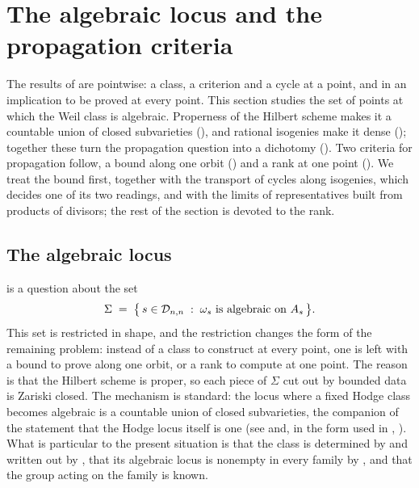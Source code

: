 \section{The algebraic locus and the propagation criteria}\label{sec:propagation}

The results of  are pointwise: a class, a criterion and
a cycle at a point, and in  an implication to be proved
at every point. This section studies the set of points at which the Weil class
is algebraic. Properness of the Hilbert scheme makes it a countable union of
closed subvarieties (), and rational isogenies make it
dense (); together these turn the propagation question
into a dichotomy (). Two criteria for propagation
follow, a bound along one orbit () and a rank at one
point (). We treat the bound first, together with
the transport of cycles along isogenies, which decides one of its two
readings, and with the limits of representatives built from products of
divisors; the rest of the section is devoted to the rank.

\subsection{The algebraic locus}
\label{ssec:properness}

 is a question about the set
\[
  \Sigma \;=\; \bigl\{\,s\in\mathcal{D}_{n,n} \;:\;
    \omega_{s}\ \text{is algebraic on}\ A_{s}\,\bigr\}.
\]
This set is restricted in shape, and the restriction changes the form
of the remaining problem: instead of a class to construct at every point, one
is left with a bound to prove along one orbit, or a rank to compute at one
point. The reason is that the Hilbert scheme is proper, so each piece of
$\Sigma$ cut out by bounded data is Zariski closed. The mechanism is standard:
the locus where a fixed Hodge class becomes algebraic is a countable union of
closed subvarieties, the companion of the statement that the Hodge locus
itself is one (see \cite[Chapter~5]{Voi03} and, in the form used in
, \cite{CDK95}). What is particular to the present situation is
that the class is determined by  and written out by
, that its algebraic locus is nonempty in every family
by , and that the group acting on the family is known.

